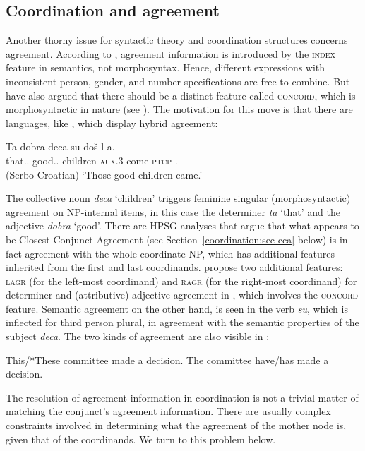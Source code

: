 \subsection{Coordination and agreement}
\label{coordination:sec-agreement}

Another thorny issue for syntactic theory and coordination structures concerns agreement. According to 
\citet[Section~2.4.2]{pollardsag}, agreement information is introduced by the \textsc{index} feature in semantics, not morphosyntax. Hence, different expressions
with inconsistent person, gender, and number specifications are free to combine. But
\citet[Chapter~2]{wechsler} have also argued that there should be a distinct feature called
\textsc{concord}, which is morphosyntactic in nature (see
). The motivation for this
move is that there are languages, like , which display hybrid agreement:

\ea
\gll Ta dobra deca su do\v{s}-l-a.\footnotemark\\
         that.\SG.\F{} good.\SG.\F{} children \textsc{aux}.3\PL{} come-\textsc{ptcp}-\N.\PL\\\hfill(Serbo-Croatian)
\glt `Those good children came.'
\z

\noindent
The collective noun \emph{deca} `children' triggers feminine singular (morphosyntactic) agreement on
NP-internal items, in this case the determiner \emph{ta} `that' and the adjective \emph{dobra}
`good'.  There are  HPSG
analyses that argue that what appears to be Closest Conjunct Agreement (see
Section~\ref{coordination:sec-cca} below) is in fact agreement with
the whole coordinate NP, which has additional features inherited from the first and last
coordinands. \citet[Section~5]{Villavicencio:Sadler:ea:05} propose two additional features:
\textsc{lagr} (for the left-most coordinand) and \textsc{ragr} (for the right-most coordinand) for
determiner and (attributive) adjective agreement in , which involves the
\textsc{concord} feature.  Semantic agreement  on the other hand, is seen in the
verb \emph{su}, which is inflected for third person plural, in agreement with the semantic
properties of the subject \emph{deca}. The two kinds of agreement are also visible in :

\eal
\ex This/*These committee made a decision.
\ex The committee have/has made a decision.
\zl


\noindent
The resolution of agreement information in coordination is not a trivial matter of matching the conjunct's agreement information. There are usually complex constraints involved in determining what the agreement of the mother node is, given that of the coordinands. We turn to this problem below.






